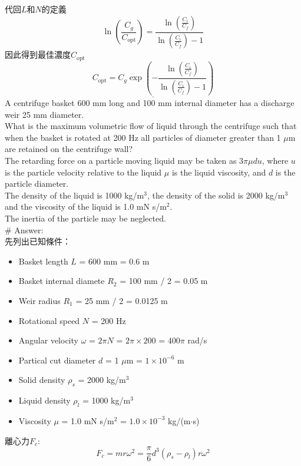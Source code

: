 ﻿\documentclass[12pt,a4paper]{article}
\begin{document}
\begin{problems}
代回$L$和$N$的定義
\begin{equation}
  \ln\left(\frac{C_g}{C_{\text{opt}}}\right) = \frac{\ln\left(\frac{C_i}{C_f}\right)}{\ln\left(\frac{C_i}{C_f}\right)-1}
\end{equation}
因此得到最佳濃度$C_{\text{opt}}$
\begin{equation}
  \underline{C_{\text{opt}} = C_g \exp\left(-\frac{\ln\left(\frac{C_i}{C_f}\right)}{\ln\left(\frac{C_i}{C_f}\right)-1}\right)}
\end{equation}
A centrifuge basket 600 mm long and 100 mm internal diameter has a discharge weir 25 mm diameter.\\
What is the maximum volumetric flow of liquid through the centrifuge such that when the basket is rotated at 200 Hz all particles of diameter greater than 1 $\mu$m are retained on the centrifuge wall?\\
The retarding force on a particle moving liquid may be taken as $3\pi\mu du$,
where $u$ is the particle velocity relative to the liquid $\mu$ is the liquid viscosity,
and $d$ is the particle diameter.\\
The density of the liquid is 1000 kg/m$^3$,
the density of the solid is 2000 kg/m$^3$ and the viscosity of the liquid is 1.0 mN s/m$^2$.\\
The inertia of the particle may be neglected.\\
\# Answer:\\
先列出已知條件：
\begin{itemize}
  \item Basket length $L$ = 600 mm = 0.6 m
  \item Basket internal diamete $R_2$ = 100 mm / 2 = 0.05 m
  \item Weir radius $R_1$ = 25 mm / 2 = 0.0125 m
  \item Rotational speed $N$ = 200 Hz
  \item Angular velocity $\omega$ = $2\pi N$ = $2\pi \times 200$ = $400\pi$ rad/s
  \item Partical cut diameter $d$ = 1 $\mu$m = $1 \times 10^{-6}$ m
  \item Solid density $\rho_s$ = 2000 kg/m$^3$
  \item Liquid density $\rho_l$ = 1000 kg/m$^3$
  \item Viscosity $\mu$ = 1.0 mN s/m$^2$ = $1.0 \times 10^{-3}$ kg/(m$\cdot$s)
\end{itemize}
離心力$F_c$:
\begin{equation}
  F_c = m r\omega^2  = \frac{\pi}{6} d^3 (\rho_s - \rho_l)  r\omega^2

\end{equation}
\end{problems}
\end{document}
